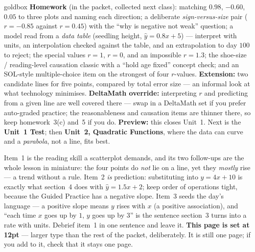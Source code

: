 \documentclass[10pt]{article}
\begin{document}
\boxguard
\begin{skillbox}{goldbox}
\textbf{Homework} (in the packet, collected next class): matching $0.98$, $-0.60$, $0.05$ to three
plots and naming each direction; a deliberate \emph{sign-versus-size} pair ($r=-0.85$ against
$r=0.45$) with the ``why is negative not weak'' question; a model read from a \emph{data table}
(seedling height, $\hat y=0.8x+5$) --- interpret with units, an interpolation checked against the
table, and an extrapolation to day $100$ to reject; the special values $r=1$, $r=0$, and an
impossible $r=1.3$; the shoe-size / reading-level causation classic with a ``hold age fixed''
concept check; and an SOL-style multiple-choice item on the strongest of four $r$-values.
\textbf{Extension:} two candidate lines for five points, compared by total error size --- an
informal look at what technology minimises. \textbf{DeltaMath override:} interpreting $r$ and
predicting from a given line are well covered there --- swap in a DeltaMath set if you prefer
auto-graded practice; the reasonableness and causation items are thinner there, so keep
homework~3(c) and~5 if you do. \textbf{Preview:} this closes Unit~1. Next is the \textbf{Unit~1
Test}; then \textbf{Unit~2, Quadratic Functions}, where the data can curve and a \emph{parabola},
not a line, fits best.
\end{skillbox}

\begin{teachernote}[Warm-Up]
Item~1 is the reading skill a scatterplot demands, and its two follow-ups are the whole lesson in
miniature: the four points do \emph{not} lie on a line, yet they \emph{mostly} rise --- a trend
without a rule. Item~2 \emph{is} prediction: substituting into $y=4x+10$ is exactly what
section~4 does with $\hat y=1.5x+2$; keep order of operations tight, because the Guided Practice
has a negative slope. Item~3 seeds the day's language --- a positive slope means $y$ rises with
$x$ (a positive association), and ``each time $x$ goes up by $1$, $y$ goes up by $3$'' is the
sentence section~3 turns into a rate with units. Debrief item~1 in one sentence and leave it.
\textbf{This page is set at 12pt} --- larger type than the rest of the packet, deliberately. It is
still one page; if you add to it, check that it stays one page.
\end{teachernote}
\end{document}
